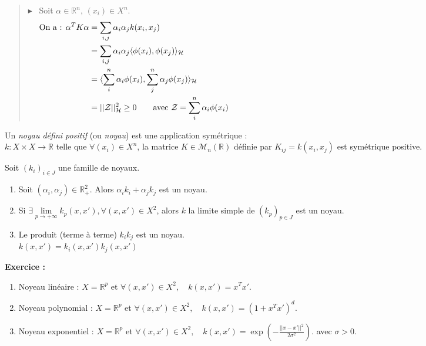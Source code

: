\documentclass[12pt,a4paper]{article}
\newcommand{\propriete}[2]{%
    \begin{tcolorbox}[colback=white,colframe=green!25!white,title=\textbf{Propriété #1}, coltitle=black]
        #2
    \end{tcolorbox}
}
\newcommand{\definition}[2]{%
    \begin{tcolorbox}[colback=white,colframe=blue!25!white,title=\textbf{Définition #1}, coltitle=black]
        #2
    \end{tcolorbox}
}
\newcommand{\preuve}[1]{%
    \begin{quote}
        $\blacktriangleright$~#1
    \end{quote}
}
\begin{document}
\preuve{
    Soit $\alpha \in \mathbb{R}^n$, $(x_i) \in X^n$.
    \begin{align*}
        \text{On a : } 
        \alpha^T K \alpha & = \sum_{i, j} \alpha_i \alpha_j k(x_i, x_j) \hspace{14.5cm} \\
        & = \sum_{i, j} \alpha_i \alpha_j \langle \phi(x_i), \phi(x_j) \rangle_{\mathcal{H}} \\
        & = \langle \sum_i^n \alpha_i \phi(x_i), \sum_j^n \alpha_j \phi(x_j) \rangle_{\mathcal{H}} \\
        & = ||\mathcal{Z}||^2_{\mathcal{H}} \geq 0 \qquad \text{avec } \mathcal{Z} = \sum_i^n \alpha_i \phi(x_i)
    \end{align*}  
}

\definition{}{
    Un \textit{noyau défini positif} (ou \textit{noyau}) est une application symétrique : \\
    $k : X \times X \longrightarrow \mathbb{R}$ telle que $\forall (x_i) \in X^n$, la matrice $K \in \mathcal{M}_n(\mathbb{R})$ définie par $K_{ij} = k(x_i, x_j)$ est symétrique positive.
}

\propriete{}{
    Soit $(k_i)_{i \in J}$ une famille de noyaux.
    \begin{enumerate}[label=\roman*)]
        \item Soit $(\alpha_i, \alpha_j) \in \mathbb{R}^2_+$. Alors $\alpha_i k_i + \alpha_j k_j$ est un noyau.
        \item Si $\exists \underset{p \rightarrow +\infty}{\lim} k_p(x, x'), \forall (x, x') \in X^2$, alors $k$ la limite simple de $(k_p)_{p \in J}$ est un noyau.
        \item Le produit (terme à terme) $k_i k_j$ est un noyau. \\
        $k(x, x') = k_i(x, x') k_j(x, x')$
    \end{enumerate}
}

\noindent\textbf{Exercice :}
\begin{enumerate}
    \item Noyeau linéaire : $X = \mathbb{R}^p$ et $\forall (x, x') \in X^2, \quad k(x, x') = x^T x'$.
    \item Noyeau polynomial : $X = \mathbb{R}^p$ et $\forall (x, x') \in X^2, \quad k(x, x') = (1 + x^T x')^d$.
    \item Noyeau exponentiel : $X = \mathbb{R}^p$ et $\forall (x, x') \in X^2, \quad k(x, x') = \exp(-\frac{||x - x'||^2}{2\sigma^2})$. avec $\sigma > 0$.
\end{enumerate}
\end{document}
